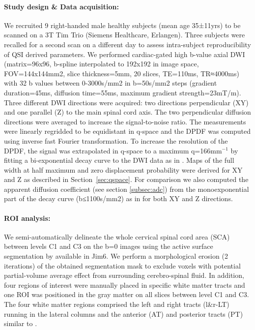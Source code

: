 \paragraph{Study design \& Data acquisition:} We recruited 9 right-handed male healthy subjects (mean age 35±11yrs) to be scanned on a 3T Tim Trio (Siemens Healthcare, Erlangen). Three subjects were recalled for a second scan on a different day to assess intra-subject reproducibility of QSI derived parameters. We performed cardiac-gated high b-value axial DWI (matrix=96x96, b-spline interpolated to 192x192 in image space, FOV=144x144mm2, slice thickness=5mm, 20 slices, TE=110ms, TR≈4000ms) with 32 b values between 0-3000s/mm2 in b=50s/mm2 steps (gradient duration=45ms, diffusion time=55ms, maximum gradient strength=23mT/m). Three different DWI directions were acquired: two directions perpendicular (XY) and one parallel (Z) to the main spinal cord axis. The two perpendicular diffusion directions were averaged to increase the signal-to-noise ratio. The measurements were linearly regridded to be equidistant in q-space and the DPDF was computed using inverse fast Fourier transformation. To increase the resolution of the DPDF, the signal was extrapolated in q-space to a maximum q=166mm$^{-1}$ by fitting a bi-exponential decay curve to the DWI data as in \citet{Cohen:2002, Farrell:2008}. Maps of the full width at half maximum and zero displacement probability were derived for XY and Z as described in Section~\ref{sec:qspace}. For comparison we also computed the apparent diffusion coefficient (see section \ref{subsec:adc}) from the monoexponential part of the decay curve (b≤1100s/mm2) as in \citet{Farrell:2008} for both XY and Z directions. 
\paragraph{ROI analysis:} We semi-automatically delineate the whole cervical spinal cord area (SCA) between levels C1 and C3 on the b=0 images using the active surface segmentation by \citet{Horsfield:2010} available in Jim6. We perform a morphological erosion (2 iterations) of the obtained segmentation mask to exclude voxels with potential partial-volume average effect from surrounding cerebro-spinal fluid. In addition, four regions of interest were manually placed in specific white matter tracts and one ROI was positioned in the gray matter on all slices between level C1 and C3. The four white matter regions comprised the left and right tracts (l\&r-LT) running in the lateral columns and the anterior (AT) and posterior tracts (PT) similar to \citet{Hesseltine:2006,Freund:2010}. 
